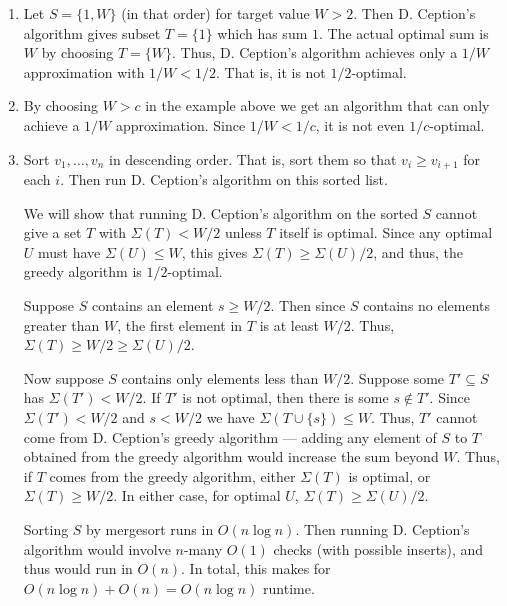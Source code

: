 \documentclass[12 pt, letterpaper]{hmcpset}
\begin{document}
\begin{solution}
	\begin{enumerate}
		\item Let $S = \{ 1, W \}$ (in that order) for target value $W > 2$. Then D. Ception's algorithm gives subset $T = \{ 1 \}$ which has sum $1$. The actual optimal sum is $W$ by choosing $T = \{ W \}$. Thus, D. Ception's algorithm achieves only a $1 / W$ approximation with $1 / W < 1 / 2$. That is, it is not $1 / 2$-optimal.

		\item By choosing $W > c$ in the example above we get an algorithm that can only achieve a $1 / W$ approximation. Since $1 / W < 1 / c$, it is not even $1 / c$-optimal.

		\item Sort $v_{1}, \dots, v_{n}$ in descending order. That is, sort them so that $v_{i} \ge v_{i + 1}$ for each $i$. Then run D. Ception's algorithm on this sorted list.

			We will show that running D. Ception's algorithm on the sorted $S$ cannot give a set $T$ with $\Sigma(T) < W / 2$ unless $T$ itself is optimal. Since any optimal $U$ must have $\Sigma(U) \le W$, this gives $\Sigma(T) \ge \Sigma(U) / 2$, and thus, the greedy algorithm is $1/2$-optimal.

			Suppose $S$ contains an element $s \ge W / 2$. Then since $S$ contains no elements greater than $W$, the first element in $T$ is at least $W / 2$. Thus, $\Sigma(T) \ge W / 2 \ge \Sigma(U) / 2$.

			Now suppose $S$ contains only elements less than $W / 2$. Suppose some $T' \subseteq S$ has $\Sigma(T') < W / 2$. If $T'$ is not optimal, then there is some $s \notin T'$. Since $\Sigma(T') < W / 2$ and $s < W / 2$ we have $\Sigma(T \cup \{ s \}) \le W$. Thus, $T'$ cannot come from D. Ception's greedy algorithm --- adding any element of $S$ to $T$ obtained from the greedy algorithm would increase the sum beyond $W$. Thus, if $T$ comes from the greedy algorithm, either $\Sigma(T)$ is optimal, or $\Sigma(T) \ge W / 2$. In either case, for optimal $U$, $\Sigma(T) \ge \Sigma(U) / 2$.

Sorting $S$ by mergesort runs in $O(n \log n)$. Then running D. Ception's algorithm would involve $n$-many $O(1)$ checks (with possible inserts), and thus would run in $O(n)$. In total, this makes for $O(n \log n) + O(n) = O(n \log n)$ runtime.
	\end{enumerate}
\end{solution}
\end{document}

